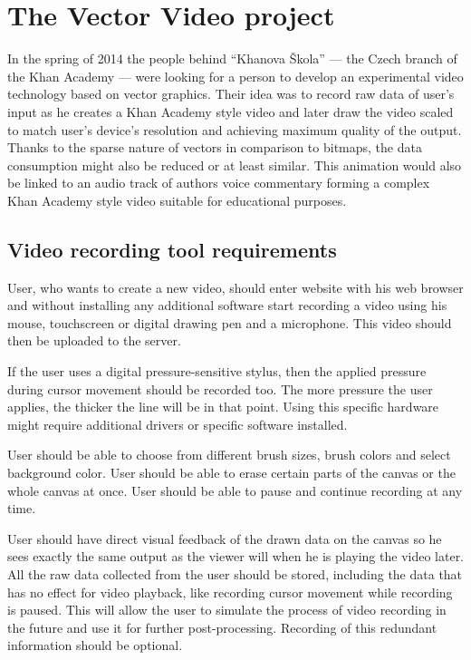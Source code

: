 \chapter{The Vector Video project}

In the spring of 2014 the people behind ``Khanova Škola'' --- the Czech branch of the Khan Academy --- were looking for a person to develop an experimental video technology based on vector graphics. Their idea was to record raw data of user's input as he creates a Khan Academy style video and later draw the video scaled to match user's device's resolution and achieving maximum quality of the output. Thanks to the sparse nature of vectors in comparison to bitmaps, the data consumption might also be reduced or at least similar. This animation would also be linked to an audio track of authors voice commentary forming a complex Khan Academy style video suitable for educational purposes.

\section{Video recording tool requirements}
User, who wants to create a new video, should enter website with his web browser and without installing any additional software start recording a video using his mouse, touchscreen or digital drawing pen and a microphone. This video should then be uploaded to the server.

If the user uses a digital pressure-sensitive stylus, then the applied pressure during cursor movement should be recorded too. The more pressure the user applies, the thicker the line will be in that point. Using this specific hardware might require additional drivers or specific software installed.

User should be able to choose from different brush sizes, brush colors and select background color. User should be able to erase certain parts of the canvas or the whole canvas at once. User should be able to pause and continue recording at any time.

User should have direct visual feedback of the drawn data on the canvas so he sees exactly the same output as the viewer will when he is playing the video later. All the raw data collected from the user should be stored, including the data that has no effect for video playback, like recording cursor movement while recording is paused. This will allow the user to simulate the process of video recording in the future and use it for further post-processing. Recording of this redundant information should be optional.

